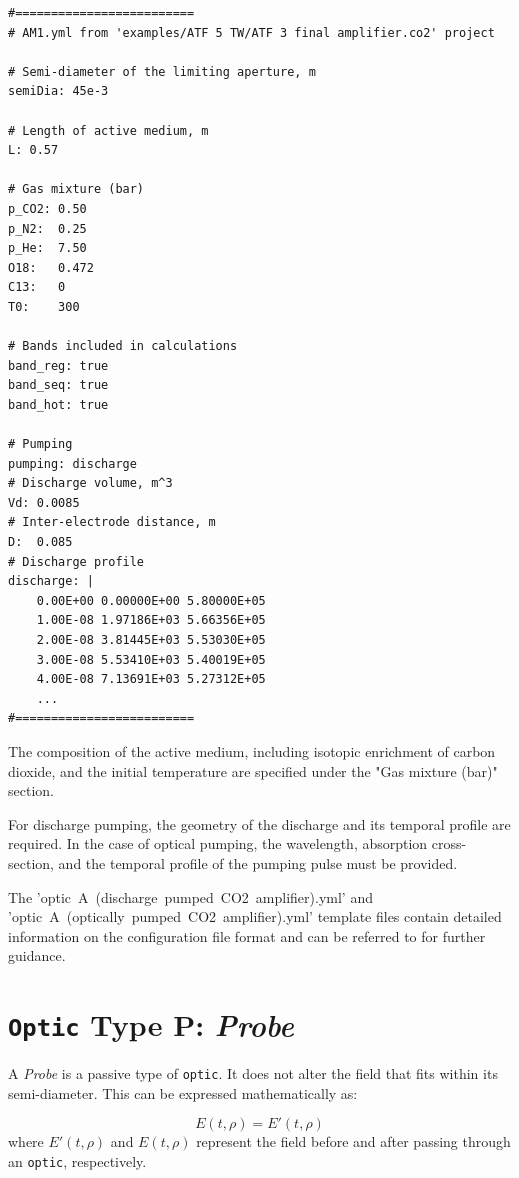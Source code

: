 \begin{verbatim}
#=========================
# AM1.yml from 'examples/ATF 5 TW/ATF 3 final amplifier.co2' project

# Semi-diameter of the limiting aperture, m
semiDia: 45e-3

# Length of active medium, m
L: 0.57

# Gas mixture (bar)
p_CO2: 0.50
p_N2:  0.25
p_He:  7.50
O18:   0.472
C13:   0
T0:    300

# Bands included in calculations
band_reg: true
band_seq: true
band_hot: true

# Pumping
pumping: discharge
# Discharge volume, m^3
Vd: 0.0085
# Inter-electrode distance, m
D:  0.085
# Discharge profile
discharge: |
    0.00E+00 0.00000E+00 5.80000E+05
    1.00E-08 1.97186E+03 5.66356E+05
    2.00E-08 3.81445E+03 5.53030E+05
    3.00E-08 5.53410E+03 5.40019E+05
    4.00E-08 7.13691E+03 5.27312E+05
    ...
#=========================
\end{verbatim}

The composition of the active medium, including isotopic enrichment of carbon dioxide, and the initial temperature are specified under the "Gas mixture (bar)" section.

For discharge pumping, the geometry of the discharge and its temporal profile are required. In the case of optical pumping, the wavelength, absorption cross-section, and the temporal profile of the pumping pulse must be provided.

The 'optic~A~(discharge~pumped~CO2~amplifier).yml' and 'optic~A~(optically~pumped~CO2~amplifier).yml' template files contain detailed information on the configuration file format and can be referred to for further guidance.


\section{\texttt{Optic} Type P: \textit{Probe}}
A \textit{Probe} is a passive type of \texttt{optic}. It does not alter the field that fits within its semi-diameter. This can be expressed mathematically as:

\begin{equation}
E(t,\rho) = E'(t,\rho)
\end{equation}
where \( E'(t,\rho) \) and \( E(t,\rho) \) represent the field before and after passing through an \texttt{optic}, respectively.

